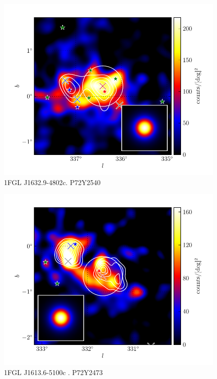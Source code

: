 \documentclass[12pt,preprint]{aastex}
\begin{document}
\begin{figure}
  \begin{center}
    \includegraphics[type=pdf,ext=.pdf,read=.pdf]{source_plots/source_1FGL_J1632.9-4802c}
  \end{center}
  \caption{1FGL J1632.9-4802c. P72Y2540
  }\label{1FGL_J1632.9-4802c}
\end{figure}


\begin{figure}
  \begin{center}
    \includegraphics[type=pdf,ext=.pdf,read=.pdf]{source_plots/source_1FGL_J1613.6-5100c}
  \end{center}
  \caption{
  1FGL J1613.6-5100c . P72Y2473
  }\label{1FGL_J1613.6-5100c}
\end{figure}
\end{document}
